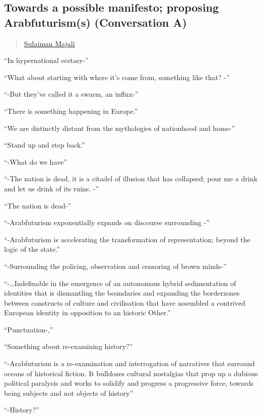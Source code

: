 \subsection{Towards a possible manifesto; proposing Arabfuturism(s)
(Conversation
A)}\label{towards-a-possible-manifesto-proposing-arabfuturisms-conversation-a}

\begin{quote}
\hyperlink{sulaiman-majali}{Sulaiman Majali}
\end{quote}

``In hypernational ecstasy-''

``What about starting with where it's come from, something like that?
-''

``-But they've called it a swarm, an influx-''

``There is something happening in Europe.''

``We are distinctly distant from the mythologies of nationhood and
home-''

``Stand up and step back.''

``-What do we have''

``-The nation is dead, it is a citadel of illusion that has collapsed;
pour me a drink and let us drink of its ruins. -''

``The nation is dead-''

``-Arabfuturism exponentially expands on discourse surrounding -''

``-Arabfuturism is accelerating the transformation of representation;
beyond the logic of the state.''

``-Surrounding the policing, observation and censoring of brown minds-''

``-\ldots{}Indefinable in the emergence of an autonomous hybrid
sedimentation of identities that is dismantling the boundaries and
expanding the borderzones between constructs of culture and civilisation
that have assembled a contrived European identity in opposition to an
historic Other.''

``Punctuation-,''

``Something about re-examining history?''

``-Arabfuturism is a re-examination and interrogation of narratives that
surround oceans of historical fiction. It bulldozes cultural nostalgias
that prop up a dubious political paralysis and works to solidify and
progress a progressive force, towards being subjects and not objects of
history''

``-History?''


